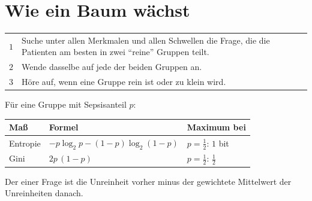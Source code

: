 \section{Wie ein Baum wächst}

\begin{merksatz}
\begin{center}
{\small
\renewcommand{\arraystretch}{1.5}
\begin{tabular}{@{}P{1.0cm}P{7.4cm}@{}}
\toprule
$1$ & Suche unter allen Merkmalen und allen Schwellen die Frage, die die Patienten am besten in zwei \enquote{reine} Gruppen teilt.\\
$2$ & Wende dasselbe auf jede der beiden Gruppen an.\\
$3$ & Höre auf, wenn eine Gruppe rein ist oder zu klein wird.\\
\bottomrule
\end{tabular}}
\end{center}

\begin{center}
\begin{minipage}{0.88\textwidth}
\end{minipage}
\end{center}
\end{merksatz}

\begin{definition}
Für eine Gruppe mit Sepsisanteil $p$:
\begin{center}
{\small
\renewcommand{\arraystretch}{1.55}
\begin{tabular}{@{}P{2.4cm}P{3.6cm}P{2.6cm}@{}}
\toprule
\textbf{Maß} & \textbf{Formel} & \textbf{Maximum bei}\\
\midrule
Entropie & $-p\log_2 p - (1-p)\log_2(1-p)$ & $p = \tfrac12$: $1$ bit\\
Gini & $2p\,(1-p)$ & $p = \tfrac12$: $\tfrac12$\\
\bottomrule
\end{tabular}}
\end{center}
Der  einer Frage ist die Unreinheit vorher minus der gewichtete Mittelwert der Unreinheiten danach.
\end{definition}

